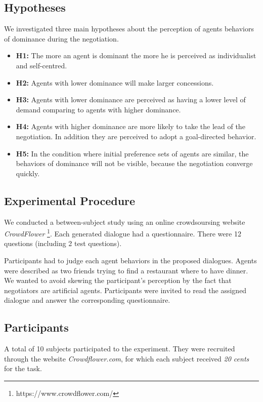 \documentclass{llncs}
\begin{document}
		\subsection{Hypotheses}
		 We investigated three main hypotheses about the perception of agents behaviors of dominance during the negotiation. 
		 \begin{itemize}
		 	\item  \textbf{H1:} The more an agent is dominant the more he is perceived as individualist and self-centred.  
		 	
		 	\item \textbf{H2:} Agents with lower dominance will make larger concessions.
		 	
		 	\item \textbf{H3:} Agents with lower dominance are perceived as having a lower level of demand comparing to agents with higher dominance. 
		 	
		 	\item \textbf{H4:} Agents with higher dominance are more likely to take the lead of the negotiation. In addition they are perceived to adopt a goal-directed behavior. 
		 	
		 	\item \textbf{H5:} In the condition where initial preference sets of agents are similar, the behaviors of dominance will not be visible, because the negotiation converge quickly.
		 	
		 \end{itemize}
				
		\subsection{Experimental Procedure}
		
		We conducted a between-subject study using an online crowdsoursing website \emph{CrowdFlower} \footnote{https://www.crowdflower.com/}. 
		Each generated dialogue had a questionnaire. There were 12 questions (including 2 test questions).
		
		Participants had to judge each agent behaviors in the proposed dialogues. Agents were described as two friends trying to find a restaurant where to have dinner. We wanted to avoid skewing the participant's perception by the fact that negotiators are artificial agents. Participants were invited to read the assigned dialogue and answer the corresponding questionnaire. 
		
		\subsection{Participants}
		A total of 10 subjects participated to the experiment. They were recruited through the website \emph{Crowdflower.com}, for which each subject received \textit{20 cents} for the task. 
		
\end{document}
